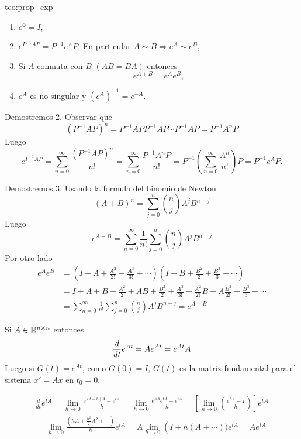 \begin{teorema}{teo:prop_exp}
\begin{enumerate}
\item $e^{\boldsymbol{0}}=I$,
 \item $e^{P^{-1}AP}=P^{-1} e^{A}P$. En particular  $A \sim B \Rightarrow e^{A}\sim e^{B}$,
 \item Si $A$  conmuta con $B$ $(A B=B A)$ entonces
 \[e^{A+B} =e^{A} e^{B} ,\]
 \item $e^A$ es no singular y $\left(e^A\right)^{-1}=e^{-A}$. 
\end{enumerate}

\end{teorema}

\begin{demo}
Demostremos 2. Observar que
\[
 \left(P^{-1}AP\right)^n=P^{-1}APP^{-1}AP\cdots P^{-1}AP=P^{-1}A^nP
\]
Luego
\[e^{P^{-1} A P}= \sum_{n=0}^{\infty}\frac{ \left(P^{-1} A P\right)^n}{n!}
= \sum_{n=0}^{\infty}\frac{P^{-1} A^n P}{n!} 
=P^{-1} \left(\sum_{n=0}^{\infty}\frac{ A^n}{n!}  \right)P=P^{-1}e^AP.
\]


Demostremos 3. Usando la formula del binomio de Newton 
\[(A+B)^{n}=\sum_{j=0}^{n} \binom{n}{j} A^{j} B^{n-j}\]
Luego
$$
e^{A+B}=\sum_{n=0}^{\infty}\frac{1}{n!} \sum_{j=0}^{n}\binom{n}{j}
A^{j} B^{n-j}
$$
Por otro lado
$$
\begin{aligned}
e^{A}  e^{B}&=\left(I+A+\frac{A^{2}}{2 !}+\frac{A^{3}}{3 !}+\cdots\right)\left(I+B+\frac{B^{2}}{2}+\frac{B^{3}}{3}+\cdots\right) \\
&=I+A+B+\frac{A^{2}}{2}+A B+\frac{B^{2}}{2}+\frac{A^{3}}{3 !}+\frac{A^{2}}{2 !} B+A \frac{B^{2}}{2 !}+\frac{B^{3}}{3}+\cdots\\
&=\sum_{n=0}^{\infty} \frac{1}{n!}\sum_{j=0}^{n}\binom{n}{j} A^j B^{n-j}=e^{A+B}
\end{aligned}
$$
 \end{demo}



\begin{teorema}{} Si $A\in\mathbb{R}^{n\times n}$ entonces
 \[
  \frac{d}{d t} e^{A t}=A e^{A t} =e^{A t} A \\ 
 \]
Luego si $G(t)=e^{A t}$, como $G(0)=I$,  $G(t)$ es la matriz fundamental para
el sistema $x'=Ax$ en $t_0=0$.
\end{teorema}

\begin{demo}
\begin{multline*}
\frac{d}{d t} e^{t A}=\lim _{h \rightarrow 0} \frac{e^{(t+h) A}-e^{t A}}{h}=\lim _{h \rightarrow 0} \frac{e^{h A} e^{t A}-e^{t A}}{h}
=\left[\lim _{n \rightarrow 0}\left(\frac{e^{h A}-I}{h}\right)\right] e^{t A}\\
=\lim _{h \rightarrow 0} \frac{\left(h A+\frac{h^2}{2} A^{2}+\cdots\right)}{h} e^{t A}
=A \lim _{h \rightarrow 0}\left(I+h(A+\cdots)) e^{t A}=A e^{t A}\right.
\end{multline*}
\end{demo}


